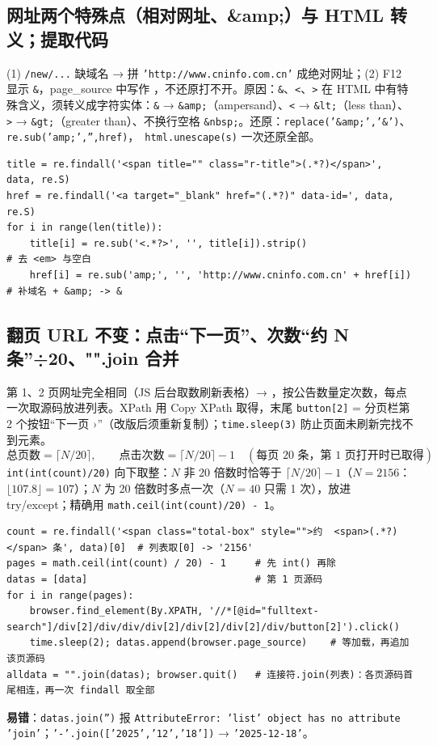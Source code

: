 \subsection{网址两个特殊点（相对网址、\&amp;）与 HTML 转义；提取代码}
(1)  \texttt{/new/...} 缺域名 → 拼 \texttt{'http://www.cninfo.com.cn'} 成绝对网址；(2) F12 显示 \texttt{\&}，page\_source 中写作 ，不还原打不开。原因：\texttt{\&}、\texttt{<}、\texttt{>} 在 HTML 中有特殊含义，须转义成字符实体：\texttt{\&} → \texttt{\&amp;}（ampersand）、\texttt{<} → \texttt{\&lt;}（less than）、\texttt{>} → \texttt{\&gt;}（greater than）、不换行空格 \texttt{\&nbsp;}。还原：\texttt{replace('\&amp;','\&')}、\texttt{re.sub('amp;','',href)}，\tagext\ \texttt{html.unescape(s)} 一次还原全部。
\begin{lstlisting}[style=pyD07]
title = re.findall('<span title="" class="r-title">(.*?)</span>', data, re.S)
href = re.findall('<a target="_blank" href="(.*?)" data-id=', data, re.S)
for i in range(len(title)):
    title[i] = re.sub('<.*?>', '', title[i]).strip()                    # 去 <em> 与空白
    href[i] = re.sub('amp;', '', 'http://www.cninfo.com.cn' + href[i])  # 补域名 + &amp; -> &
\end{lstlisting}

\subsection{翻页 URL 不变：点击“下一页”、次数“约 N 条”÷20、"".join 合并}
第 1、2 页网址完全相同（JS 后台取数刷新表格）→ ，按公告数量定次数，每点一次取源码放进列表。XPath 用 Copy XPath 取得，末尾 \texttt{button[2]} = 分页栏第 2 个按钮“下一页 ›”（改版后须重新复制）；\texttt{time.sleep(3)} 防止页面未刷新完找不到元素。
\[
\text{总页数}=\lceil N/20\rceil,\qquad \text{点击次数}=\lceil N/20\rceil-1\quad(\text{每页 20 条，第 1 页打开时已取得})
\]
\texttt{int(int(count)/20)} 向下取整：$N$ 非 20 倍数时恰等于 $\lceil N/20\rceil-1$（$N=2156$：$\lfloor 107.8\rfloor=107$）；$N$ 为 20 倍数时多点一次（$N=40$ 只需 1 次），放进 try/except；精确用 \texttt{math.ceil(int(count)/20) - 1}。
\begin{lstlisting}[style=pyD07]
count = re.findall('<span class="total-box" style="">约  <span>(.*?)</span> 条', data)[0]  # 列表取[0] -> '2156'
pages = math.ceil(int(count) / 20) - 1     # 先 int() 再除
datas = [data]                             # 第 1 页源码
for i in range(pages):
    browser.find_element(By.XPATH, '//*[@id="fulltext-search"]/div[2]/div/div/div[2]/div[2]/div[2]/div/button[2]').click()
    time.sleep(2); datas.append(browser.page_source)    # 等加载，再追加该页源码
alldata = "".join(datas); browser.quit()   # 连接符.join(列表)：各页源码首尾相连，再一次 findall 取全部
\end{lstlisting}
\textbf{易错}：\texttt{datas.join('')} 报 \texttt{AttributeError: 'list' object has no attribute 'join'}；\texttt{'-'.join(['2025',\allowbreak'12',\allowbreak'18'])} → \texttt{'2025-12-18'}。

